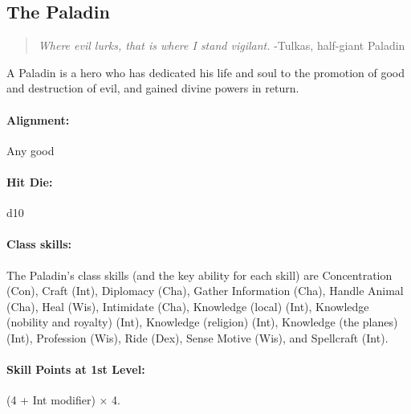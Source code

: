 \subsection[Paladin]{The Paladin}
\label{sec:Paladin}
\begin{quote}
\emph{Where evil lurks, that is where I stand vigilant.}
-Tulkas, half-giant Paladin
\end{quote}

A Paladin is a hero who has dedicated his life and soul to the promotion of good and destruction of evil, and gained divine powers in return.
\paragraph{Alignment:} Any good
\paragraph{Hit Die:} d10
\paragraph{Class skills:}
The Paladin's class skills (and the key ability for each skill) are Concentration (Con), Craft (Int), Diplomacy (Cha), Gather Information (Cha), Handle Animal (Cha), Heal (Wis), Intimidate (Cha), Knowledge (local) (Int), Knowledge (nobility and royalty) (Int), Knowledge (religion) (Int), Knowledge (the planes) (Int), Profession (Wis), Ride (Dex), Sense Motive (Wis), and Spellcraft (Int).

\paragraph{Skill Points at 1st Level:} (4 + Int modifier) $\times$ 4.
